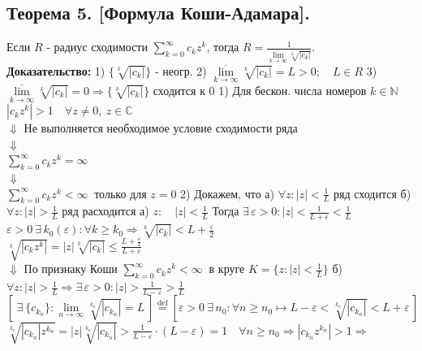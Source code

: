 \documentclass[a4paper,12pt]{article} %
\begin{document}
\subsection{Теорема 5. [Формула Коши-Адамара].}
Если $R$ - радиус сходимости $\sum\limits_{k = 0}^\infty c_k z^k$, тогда $ R = \frac{1}{\overline{\lim\limits_{k \to \infty}} \sqrt[k]{|c_k|}} $.\\
\textbf{Доказательство:}
1) $ \{ \sqrt[k]{|c_k|}\} $ - неогр.
2) $ \overline{\lim\limits_{k \to \infty} }\sqrt[k]{|c_k|}  = L > 0; \quad L \in R$
3) $ \overline{\lim\limits_{k \to \infty} }\sqrt[k]{|c_k|}  = 0 \Rightarrow \{ \sqrt[k]{|c_k|}\}$ сходится к 0
1) Для бескон. числа номеров $k \in \mathbb{N}$ \\
\indent$|c_k z^k| > 1 \quad \forall z \neq 0, \  z \in \mathbb{C}$ \\
\hspace*{3 cm} $\Downarrow$
Не выполняется необходимое условие сходимости ряда \\
\hspace*{3 cm} $\Downarrow$\\
\hspace*{2 cm} $\sum\limits_{k = 0}^\infty c_k z^k = \infty $\\
\hspace*{3 cm} $\Downarrow$\\
\hspace*{1.9 cm} $\sum\limits_{k = 0}^\infty c_k z^k < \infty \ $ только для $z = 0$
2) Докажем, что
а) $\forall z: |z| < \frac{1}{L}$ ряд сходится
б) $\forall z: |z| > \frac{1}{L}$ ряд расходится
а) $z: \quad |z| < \frac{1}{L}$
Тогда $\exists \, \varepsilon > 0: |z| < \frac{1}{L + \varepsilon} < \frac{1}{L} $\\
$\varepsilon > 0 \  \exists \, k_0(\varepsilon): \forall k \geqslant k_0 \Rightarrow \sqrt[k]{|c_k|} < L + \frac{\varepsilon}{2}
$ \\
$ \sqrt[k]{|c_k z^k|} = |z| \sqrt[k]{|c_k|} \leqslant \frac{L + \frac{\varepsilon}{2}}{L + \varepsilon}
$\\
$\Downarrow$ По признаку Коши
$\sum\limits_{k = 0}^\infty c_k z^k < \infty \ $ в круге $K = \{z: |z| < \frac{1}{L}\}$
б) $\forall z: |z| > \frac{1}{L} \Rightarrow \exists \, \varepsilon > 0: |z| > \frac{1}{L - \varepsilon} > \frac{1}{L} $
$[\   \exists \  \{c_{k_n}\} : \lim\limits_{n \to \infty} \sqrt[k_n]{|c_{k_n}|} = L \,] \stackrel{\text{def}}{=} [\varepsilon > 0 \  \exists \, n_0 : \forall n \geqslant n_0 \mapsto L - \varepsilon < \sqrt[k_n]{|c_{k_n}|} < L + \varepsilon \,]$ 
$\sqrt[k_n]{|c_{k_n}| z^{k_n}} = |z| \sqrt[k_n]{|c_{k_n}|} > \frac{1}{L - \varepsilon} \cdot (L - \varepsilon) = 1 \quad \forall n \geqslant n_0  \Rightarrow |c_{k_n} z^{k_n}| > 1 \Rightarrow$
\end{document}
